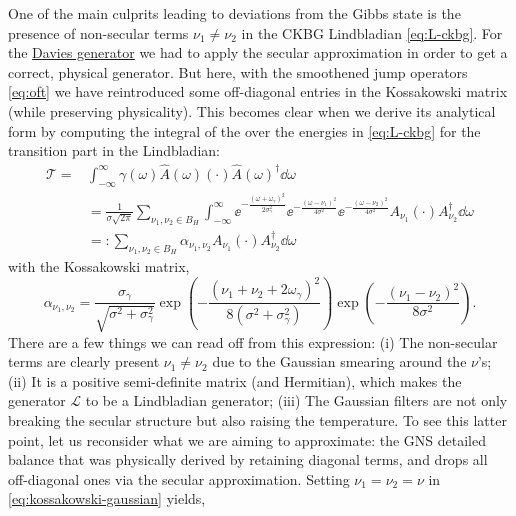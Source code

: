 One of the main culprits leading to deviations from the Gibbs state is the presence of non-secular terms $\nu_1 \neq \nu_2$ in the CKBG Lindbladian \eqref{eq:L-ckbg}. For the \hyperref[subsec:davies]{Davies generator} we had to apply the secular approximation in order to get a correct, physical generator. But here, with the smoothened jump operators \eqref{eq:oft} we have reintroduced some off-diagonal entries in the Kossakowski matrix (while preserving physicality). This becomes clear when we derive its analytical form by computing the integral of the over the energies in \eqref{eq:L-ckbg} for the transition part in the Lindbladian:
\begin{equation} \label{eq:gauss-transition-part-of-lindbladian}
    \begin{split}
        \mathcal{T} = &\int_{-\infty}^\infty \gamma(\omega) \hat{A}(\omega) (\cdot) \hat{A}(\omega)^\dagger \dd \omega \\
        &= \frac{1}{\sigma \sqrt{2\pi}} \sum_{\nu_1, \nu_2 \in B_H} \int_{-\infty}^{\infty} \ee^{-\frac{(\omega + \omega_\gamma)^2}{2\sigma_\gamma^2}}\ee^{-\frac{(\omega - \nu_1)^2}{4\sigma^2}}\ee^{-\frac{(\omega - \nu_2)^2}{4\sigma^2}}A_{\nu_1}(\cdot)A_{\nu_2}^\dagger \dd \omega \\
        &=: \sum_{\nu_1, \nu_2 \in B_H} \alpha_{\nu_1, \nu_2} A_{\nu_1}(\cdot)A_{\nu_2}^\dagger \dd \omega
    \end{split}
\end{equation}
with the Kossakowski matrix,
\begin{equation} \label{eq:kossakowski-gaussian}
    \alpha_{\nu_1,\nu_2} = \frac{\sigma_\gamma}{\sqrt{\sigma^2 + \sigma_\gamma^2}} \exp\left(-\frac{(\nu_1 + \nu_2 + 2\omega_\gamma)^2}{8(\sigma^2 + \sigma_\gamma^2)}\right)\exp\left(-\frac{(\nu_1 - \nu_2)^2}{8\sigma^2}\right).
    \tag{k-g}
\end{equation}
There are a few things we can read off from this expression: (i) The non-secular terms are clearly present $\nu_1 \neq \nu_2$ due to the Gaussian smearing around the $\nu$'s; (ii) It is a positive semi-definite matrix (and Hermitian), which makes the generator $\mathcal{L}$ to be a Lindbladian generator; (iii) The Gaussian filters are not only breaking the secular structure but also raising the temperature. To see this latter point, let us reconsider what we are aiming to approximate: the GNS detailed balance that was physically derived by retaining diagonal terms, and drops all off-diagonal ones via the secular approximation. Setting $\nu_1 = \nu_2 = \nu$ in \eqref{eq:kossakowski-gaussian} yields, 
